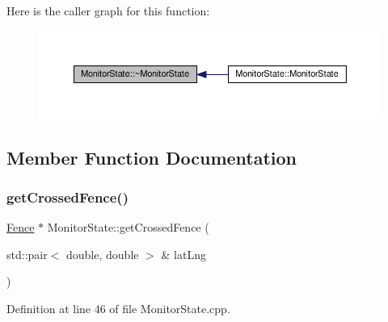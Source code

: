 Here is the caller graph for this function\+:\nopagebreak
\begin{figure}[H]
\begin{center}
\leavevmode
\includegraphics[width=350pt]{dd/d45/class_monitor_state_a8dc9d7a46aa3d0190ec65b0d56167d3e_icgraph}
\end{center}
\end{figure}


\subsection{Member Function Documentation}
\mbox{\label{class_monitor_state_a332c5f42bf46cd217e36f300e5279766}} 
\subsubsection{\texorpdfstring{get\+Crossed\+Fence()}{getCrossedFence()}}
{\footnotesize\ttfamily \hyperlink{class_fence}{Fence} $\ast$ Monitor\+State\+::get\+Crossed\+Fence (\begin{DoxyParamCaption}\item[{std\+::pair$<$ double, double $>$ \&}]{lat\+Lng }\end{DoxyParamCaption})\hspace{0.3cm}{\ttfamily [protected]}}



Definition at line 46 of file Monitor\+State.\+cpp.


